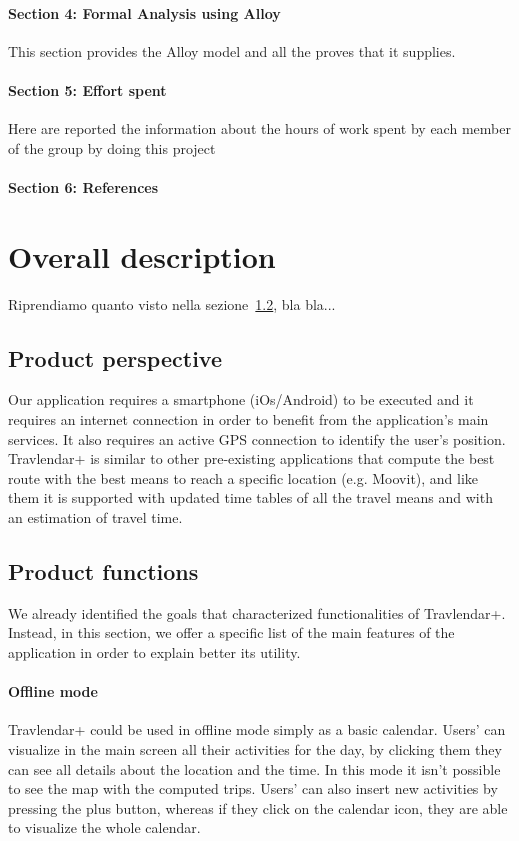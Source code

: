 \documentclass[12pt,titlepage]{article}
\begin{document}
\paragraph{Section 4: Formal Analysis using Alloy}
This section provides the Alloy model and all the proves that it supplies.
\paragraph{Section 5: Effort spent}
Here are reported the information about the hours of work spent by each member of the group by doing this project 
\paragraph{Section 6: References}
\pagebreak

\section{Overall description}\label{sec:crit}

Riprendiamo quanto visto nella sezione~\ref{sec:mod1}, bla bla...
\subsection{Product perspective}\label{sec:mod1}
Our application requires a smartphone (iOs/Android) to be executed and it requires an internet connection in order to benefit from the application's main services.
It also requires an active GPS connection to identify the user's position. 
Travlendar+ is similar to other pre-existing applications that compute the best route with the best means to reach a specific location (e.g. Moovit), and like them it is supported with updated time tables of all the travel means and with an estimation of travel time. 


\subsection{Product functions}\label{sec:mod1}
We already identified the goals that characterized functionalities of Travlendar+. Instead, in this section, we offer a specific list of the main features of the application in order to explain better its utility. 

\paragraph{Offline mode}
Travlendar+ could be used in offline mode simply as a basic calendar. Users' can visualize in the main screen all their activities for the day, by clicking them they can see all details about the location and the time. In this mode it isn't possible to see the map with the computed trips. Users' can also insert new activities by pressing the plus button, whereas if they click on the calendar icon, they are able to visualize the whole calendar. 
\end{document}
